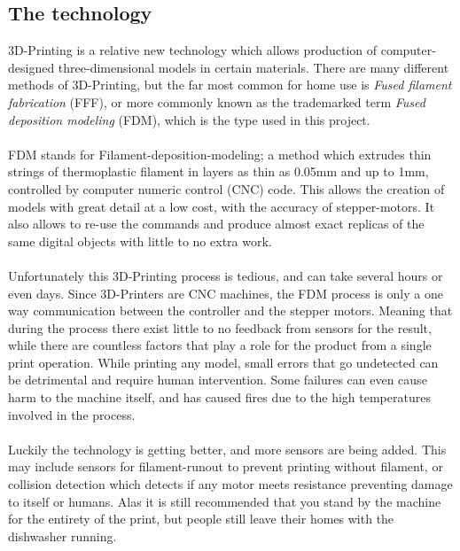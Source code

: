 \documentclass[a4paper, 12pt]{article}
\newcommand{\mysubsection}[1]{\subsection*{#1} \addcontentsline{toc}{subsection}{#1}}
\begin{document}
    \mysubsection{The technology}
    3D-Printing is a relative new technology which allows production of computer-designed three-dimensional models
    in certain materials.
    There are many different methods of 3D-Printing, but the far most common for home use is \textit{Fused filament
    fabrication} (FFF), or more commonly known as the trademarked term \textit{Fused deposition modeling} (FDM),
    which is the type used in this project.
    \\\\
    FDM stands for Filament-deposition-modeling;
    a method which extrudes thin strings of thermoplastic filament
    in layers as thin as 0.05mm and up to 1mm, controlled by computer numeric control (CNC) code.
    This allows the creation of models with great detail at a low cost, with the accuracy of stepper-motors.
    It also allows to re-use the commands and produce almost exact replicas of the same digital objects with
    little to no extra work.
    \\\\
    Unfortunately this 3D-Printing process is tedious, and can take several hours or even days.
    Since 3D-Printers are CNC machines, the FDM process is only a one way communication between the controller
    and the stepper motors.
    Meaning that during the process there exist little to no feedback from sensors for the result, while there are countless
    factors that play a role for the product from a single print operation.
    While printing any model, small errors that go undetected can be detrimental and require human intervention.
    Some failures can even cause harm to the machine itself, and has caused fires due to the high temperatures involved in
    the process.
    \\\\
    Luckily the technology is getting better, and more sensors are being added.
    This may include sensors for filament-runout to prevent printing without filament, or collision detection which detects
    if any motor meets resistance preventing damage to itself or humans.
    Alas it is still recommended that you stand by the machine for the entirety of the print, but people still leave their
    homes with the dishwasher running.
\end{document}
